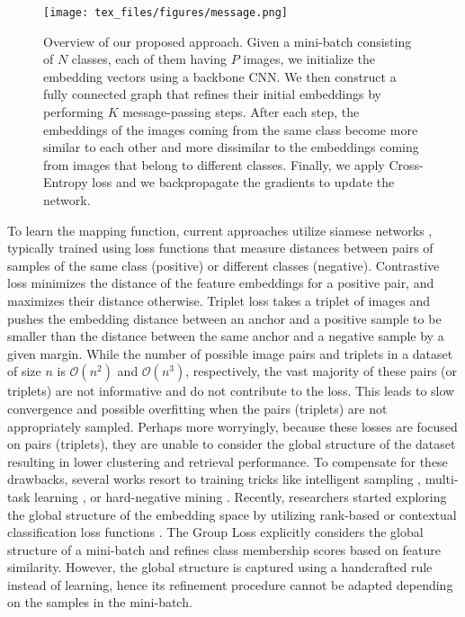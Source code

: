 \documentclass{article}
\begin{document}
\begin{figure*}[hbt!]
\begin{center}
\centerline{\texttt{[image: tex\_files/figures/message.png]}}
   \caption{Overview of our proposed approach. Given a mini-batch consisting of $N$ classes, each of them having $P$ images, we initialize the embedding vectors using a backbone CNN. We then construct a fully connected graph that refines their initial embeddings by performing $K$ message-passing steps. After each step, the embeddings of the images coming from the same class become more similar to each other and more dissimilar to the embeddings coming from images that belong to different classes. Finally, we apply Cross-Entropy loss and we backpropagate the gradients to update the network.}
\label{fig:message}
\end{center}
\end{figure*}

To learn the mapping function, current approaches utilize siamese networks \cite{bromley1994signature}, typically trained using loss functions that measure distances between pairs of samples of the same class (positive) or different classes (negative). 
Contrastive loss \cite{bromley1994signature} minimizes the distance of the feature embeddings for a positive pair, and maximizes their distance otherwise.
Triplet loss \cite{DBLP:conf/nips/SchultzJ03,DBLP:journals/jmlr/WeinbergerS09} takes a triplet of images and pushes the embedding distance between an anchor and a positive sample to be smaller than the distance between the same anchor and a negative sample by a given margin.
While the number of possible image pairs and triplets in a dataset of size $n$ is $\mathcal{O}(n^2)$ and $\mathcal{O}(n^3)$, respectively, the vast majority of these pairs (or triplets) are not informative and do not contribute to the loss. 
This leads to slow convergence and possible overfitting when the pairs (triplets) are not appropriately sampled. Perhaps more worryingly, because these losses are focused on pairs (triplets), they are unable to consider the global structure of the dataset resulting in lower clustering and retrieval performance. To compensate for these drawbacks, several works resort to training tricks like intelligent sampling \cite{DBLP:conf/eccv/GeHDS18,DBLP:conf/iccv/ManmathaWSK17}, multi-task learning \cite{DBLP:conf/cvpr/ZhangZLZ16}, or hard-negative mining \cite{DBLP:conf/cvpr/SchroffKP15, DBLP:journals/corr/abs-2007-12749}. 
Recently, researchers started exploring the global structure of the embedding space by utilizing rank-based \cite{DBLP:conf/cvpr/Cakir0XKS19,DBLP:conf/cvpr/0003CBS18,DBLP:journals/corr/abs-1906-07589} or contextual classification loss functions \cite{DBLP:conf/cvpr/Cakir0XKS19,DBLP:conf/eccv/GrLoss,DBLP:conf/cvpr/0003CBS18,DBLP:journals/corr/abs-1906-07589,DBLP:conf/nips/Sohn16,DBLP:conf/cvpr/SongXJS16,DBLP:conf/aaai/ZhengJSZWH19}. The Group Loss \cite{DBLP:conf/eccv/GrLoss} explicitly considers the global structure of a mini-batch and refines class membership scores based on feature similarity. However, the global structure is captured using a handcrafted rule instead of learning, hence its refinement procedure cannot be adapted depending on the samples in the mini-batch.
\end{document}
